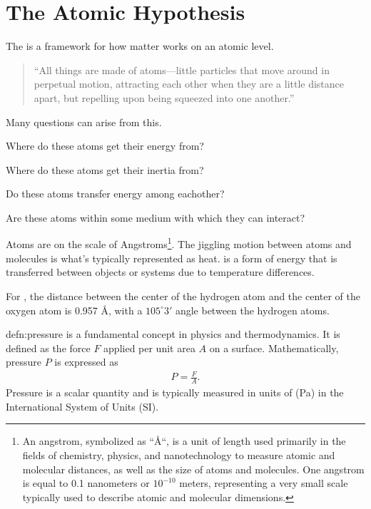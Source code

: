 \section{The Atomic Hypothesis\label{section:The Atomic Hypothesis}}

The  is a framework for how matter works on an atomic level.

\begin{quotation}
	``All things are made of atoms—little particles that move around in perpetual motion, attracting each other when they are a little distance apart, but repelling upon being squeezed into one another.''
\end{quotation}

Many questions can arise from this.

\begin{questions}
	\item Where do these atoms get their energy from?
	\item Where do these atoms get their inertia from?
	\item Do these atoms transfer energy among eachother?
	\item Are these atoms within some medium with which they can interact?
\end{questions}

Atoms are on the scale of Angstroms\footnote{An angstrom, symbolized as ``\AA``, is a unit of length used primarily in the fields of chemistry, physics, and nanotechnology to measure atomic and molecular distances, as well as the size of atoms and molecules. One angstrom is equal to 0.1 nanometers or $10^{-10}$ meters, representing a very small scale typically used to describe atomic and molecular dimensions.}. The jiggling motion between atoms and molecules is what's typically represented as heat.  is a form of energy that is transferred between objects or systems due to temperature differences.

\begin{interestnote}
	For , the distance between the center of the hydrogen atom and the center of the oxygen atom is 0.957 \AA, with a $105^\circ3'$ angle between the hydrogen atoms.
\end{interestnote}

\begin{defn}[Pressure]{defn:pressure}
	 is a fundamental concept in physics and thermodynamics. It is defined as the force $F$ applied per unit area $A$ on a surface. Mathematically, pressure $P$ is expressed as 
	\begin{align}
		P=\frac{F}{A}.
	\end{align}
	Pressure is a scalar quantity and is typically measured in units of  (Pa) in the International System of Units (SI). 
\end{defn}

